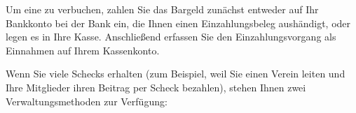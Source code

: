 Um eine  zu verbuchen, zahlen Sie das Bargeld zunächst entweder auf Ihr Bankkonto bei der Bank ein, die Ihnen einen Einzahlungsbeleg aushändigt, oder legen es in Ihre Kasse. Anschließend erfassen Sie den Einzahlungsvorgang als Einnahmen auf Ihrem Kassenkonto.

Wenn Sie viele Schecks erhalten (zum Beispiel, weil Sie einen Verein leiten und Ihre Mitglieder ihren Beitrag per Scheck bezahlen), stehen Ihnen zwei Verwaltungsmethoden zur Verfügung:

